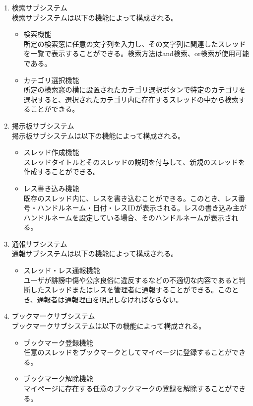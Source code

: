 \documentclass[a4j]{jarticle}
\begin{document}
\begin{enumerate}
  \item 検索サブシステム\\
  検索サブシステムは以下の機能によって構成される。
  \begin{itemize}
    \item 検索機能\\
    所定の検索窓に任意の文字列を入力し、その文字列に関連したスレッドを一覧で表示することができる。検索方法はand検索、or検索が使用可能である。
    \item カテゴリ選択機能\\
    所定の検索窓の横に設置されたカテゴリ選択ボタンで特定のカテゴリを選択すると、選択されたカテゴリ内に存在するスレッドの中から検索することができる。
  \end{itemize}

  \item 掲示板サブシステム\\
  掲示板サブシステムは以下の機能によって構成される。
  \begin{itemize}
    \item スレッド作成機能\\
    スレッドタイトルとそのスレッドの説明を付与して、新規のスレッドを作成することができる。
    \item レス書き込み機能\\
    既存のスレッド内に、レスを書き込むことができる。このとき、レス番号・ハンドルネーム・日付・レスIDが表示される。レスの書き込み主がハンドルネームを設定している場合、そのハンドルネームが表示される。
  \end{itemize}

  \item 通報サブシステム\\
  通報サブシステムは以下の機能によって構成される。
  \begin{itemize}
    \item スレッド・レス通報機能\\
    ユーザが誹謗中傷や公序良俗に違反するなどの不適切な内容であると判断したスレッドまたはレスを管理者に通報することができる。このとき、通報者は通報理由を明記しなければならない。
  \end{itemize}

  \item ブックマークサブシステム\\
  ブックマークサブシステムは以下の機能によって構成される。
  \begin{itemize}
    \item ブックマーク登録機能\\
    任意のスレッドをブックマークとしてマイページに登録することができる。
    \item ブックマーク解除機能\\
    マイページに存在する任意のブックマークの登録を解除することができる。
  \end{itemize}


\end{enumerate}
\end{document}
